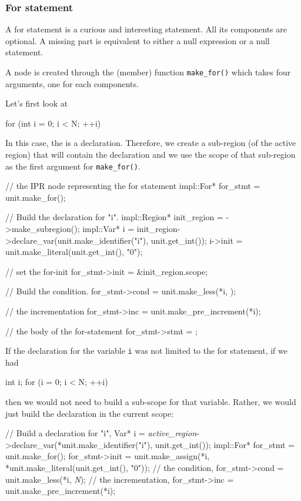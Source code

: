 \documentclass[a4paper,12pt]{article}
\begin{document}
\subsubsection{For statement}
A for statement is a curious and interesting statement.  All its
components are optional.  A missing part is equivalent to either a null
expression or a null statement.

A  node is created through the (member) function
\texttt{make\_for()} which takes four arguments, one for each components.

Let's first look at 
\begin{Program}
  for (int i = 0; i < N; ++i)
\end{Program}
In this case, the  is a declaration.  Therefore,
we create a sub-region (of the active region) that will contain the declaration
and we use the scope of that sub-region as the first argument for
\texttt{make\_for()}. 
\begin{Program}
  // the IPR node representing the for statement 
  impl::For* for_stmt = unit.make_for();

  // Build the declaration for "i".
  impl::Region* init_region = ->make_subregion();
  impl::Var* i = init_region->declare_var(unit.make_identifier("i"),
                                          unit.get_int());
  i->init = unit.make_literal(unit.get_int(), "0");

  // set the for-init
  for_stmt->init = &init_region.scope;

  // Build the condition.
  for_stmt->cond = unit.make_less(*i, );

  // the incrementation
  for_stmt->inc = unit.make_pre_increment(*i);
  
  // the body of the for-statement
  for_stmt->stmt = ;
\end{Program}

If the declaration for the variable \texttt{i} was not limited to the
for statement, \ie{} if we had
\begin{Program}
  int i;
  for (i = 0; i < N; ++i)
\end{Program}
then we would not need to build a sub-scope for that variable.  Rather, we
would just build the declaration in the current scope:
\begin{Program}
// Build a declaration for "i",
Var* i = \textit{active_region}->declare_var(*unit.make_identifier("i"), unit.get_int());
impl::For* for_stmt = unit.make_for();
for_stmt->init = unit.make_assign(*i, *unit.make_literal(unit.get_int(), "0"));
// the condition,
for_stmt->cond = unit.make_less(*i, \textit{N});
// the incrementation,
for_stmt->inc = unit.make_pre_increment(*i);
\end{Program}
\end{document}
